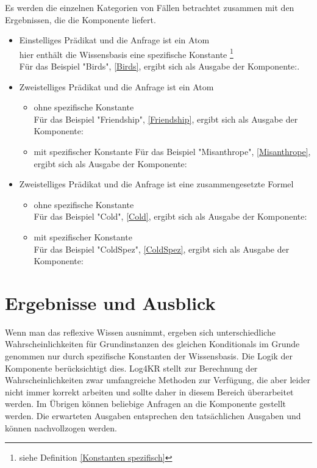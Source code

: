 \documentclass[draft]{scrreprt}
\begin{document}
{Es werden die einzelnen Kategorien von Fällen betrachtet zusammen mit den Ergebnissen, die die Komponente liefert. 

\begin{itemize}
	\item Einstelliges Prädikat und die Anfrage ist ein Atom\\
	hier enthält die Wissensbasis eine spezifische Konstante \footnote{siehe Definition \ref{Konstanten spezifisch}}\\
	Für das Beispiel "{}Birds"{}, \ref{Birds}, ergibt sich als Ausgabe der Komponente:.
	
	\item Zweistelliges Prädikat und die Anfrage ist ein Atom
	\begin{itemize}
		\item ohne spezifische Konstante\\
			Für das Beispiel "{}Friendship"{}, \ref{Friendship}, ergibt sich als Ausgabe der Komponente:
				
		\item mit spezifischer Konstante
			Für das Beispiel "{}Misanthrope"{}, \ref{Misanthrope}, ergibt sich als Ausgabe der Komponente:
				
	\end{itemize}
	\item Zweistelliges Prädikat und die Anfrage ist eine zusammengesetzte Formel
\begin{itemize}
	\item ohne spezifische Konstante\\
		Für das Beispiel "{}Cold"{}, \ref{Cold}, ergibt sich als Ausgabe der Komponente:
			
	\item mit spezifischer Konstante\\
		Für das Beispiel "{}ColdSpez"{}, \ref{ColdSpez}, ergibt sich als Ausgabe der Komponente:
\end{itemize}

	
\end{itemize}




\chapter{Ergebnisse und Ausblick}\label{Erg}
Wenn man das reflexive Wissen ausnimmt, ergeben sich unterschiedliche Wahrscheinlichkeiten für Grundinstanzen des gleichen Konditionals im Grunde genommen nur durch spezifische Konstanten der Wissensbasis. Die Logik der Komponente berücksichtigt dies. Log4KR stellt zur Berechnung der Wahrscheinlichkeiten zwar umfangreiche Methoden zur Verfügung, die aber leider nicht immer korrekt arbeiten und sollte daher in diesem Bereich überarbeitet werden. Im Übrigen können beliebige Anfragen an die Komponente gestellt werden. Die erwarteten Ausgaben entsprechen den tatsächlichen Ausgaben und können nachvollzogen werden. 

}
\end{document}
